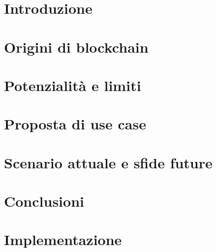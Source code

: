 \documentclass[12pt,twoside]{report}
\begin{document}
\newpage

\tableofcontents
\listoffigures

\chapter{Introduzione}


\chapter{Origini di blockchain}\label{cap:origini}


\chapter{Potenzialità e limiti}\label{cap:analisiTecnologia}


\chapter{Proposta di use case}\label{cap:proposta}


\chapter{Scenario attuale e sfide future}\label{cap:scenario}


\chapter{Conclusioni}\label{cap:conclusioni}


\appendix

\chapter{Implementazione}


{}

\end{document}
